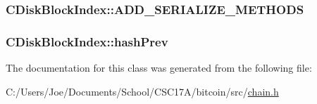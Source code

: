 \subsubsection[{A\+D\+D\+\_\+\+S\+E\+R\+I\+A\+L\+I\+Z\+E\+\_\+\+M\+E\+T\+H\+O\+D\+S}]{\setlength{\rightskip}{0pt plus 5cm}C\+Disk\+Block\+Index\+::\+A\+D\+D\+\_\+\+S\+E\+R\+I\+A\+L\+I\+Z\+E\+\_\+\+M\+E\+T\+H\+O\+D\+S}\label{class_c_disk_block_index_adfa97e82f2e6db827fc6b8b5e351a1f9}
\hypertarget{class_c_disk_block_index_a3a1730201a8523fb947c4d4f632a4212}{}
\subsubsection[{hash\+Prev}]{ C\+Disk\+Block\+Index\+::hash\+Prev}\label{class_c_disk_block_index_a3a1730201a8523fb947c4d4f632a4212}


The documentation for this class was generated from the following file\+:\begin{DoxyCompactItemize}
\item 
C\+:/\+Users/\+Joe/\+Documents/\+School/\+C\+S\+C17\+A/bitcoin/src/\hyperlink{chain_8h}{chain.\+h}\end{DoxyCompactItemize}
